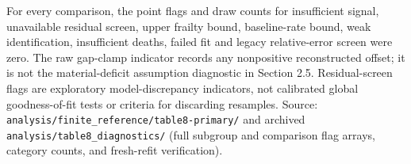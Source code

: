 \documentclass[
]{article}
\begin{document}
For every comparison, the point flags and draw counts for insufficient signal, unavailable residual screen, upper frailty bound, baseline-rate bound, weak identification, insufficient deaths, failed fit and legacy relative-error screen were zero. The raw gap-clamp indicator records any nonpositive reconstructed offset; it is not the material-deficit assumption diagnostic in Section 2.5. Residual-screen flags are exploratory model-discrepancy indicators, not calibrated global goodness-of-fit tests or criteria for discarding resamples. Source: \texttt{analysis/finite\_reference/table8-primary/} and archived \texttt{analysis/table8\_diagnostics/} (full subgroup and comparison flag arrays, category counts, and fresh-refit verification).
\end{document}
